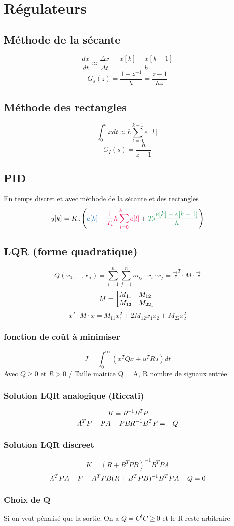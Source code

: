 \documentclass[resume]{subfiles}
\begin{document}
\section{Régulateurs}
\subsection{Méthode de la sécante}
$$\boxed{\frac{dx}{dt}\approx\frac{\Delta x}{\Delta t}=\frac{x[k]-x[k-1]}{h}}$$
$$G_s(z)=\frac{1-z^{-1}}{h}=\frac{z-1}{hz}$$
\subsection{Méthode des rectangles}
$$\boxed{\int_{0}^{t}xdt\approx h\sum_{l=0}^{k-1}e[l]}$$
$$G_{I}(s)=\frac{h}{z-1}$$
\subsection{PID}
En temps discret et avec méthode de la sécante et des rectangles
$$y[k]=K_p\left(\Pcolor{e[k]}+\Icolor{\frac{1}{T_i}h\sum_{l=0}^{k-1}e[l]}+\Dcolor{T_d\frac{e[k]-e[k-1]}{h}}\right)$$

\subsection{LQR (forme quadratique)}
$$Q(x_1,...,x_n) = \sum_{i=1}^{n}\sum_{j=1}^{n}m_{ij}\cdot x_i\cdot x_j = \vec{x}^T\cdot M\cdot \vec{x}$$
$$M = 
\begin{bmatrix}
M_{11} & M_{12}\\
M_{12} & M_{22}
\end{bmatrix}\\$$
$$x^T\cdot M\cdot x = M_{11}x_1^2+2M_{12}x_1x_2+M_{22}x_2^2$$

\subsubsection{fonction de coût à minimiser}
$$J = \int_0^{\infty}(x^TQx + u^TRu)dt$$
Avec $Q\geq0$ et $R > 0$  / Taille matrice Q = A, R nombre de signaux entrée
\subsubsection{Solution LQR analogique (Riccati)}

$$
K = R^{-1}B^TP$$
$$A^TP + PA-PBR^{-1}B^TP = -Q \space\space\space$$

\subsubsection{Solution LQR discreet}

$$
K = (R+B^TPB)^{-1}B^TPA$$
$$A^TPA-P-A^TPB(R+B^TPB)^{-1}B^TPA+Q=0\space\space\space$$

\subsubsection{Choix de Q}
Si on veut pénalisé que la sortie. On a $Q = C^tC \geq 0$  et le R reste arbitraire
\end{document}
